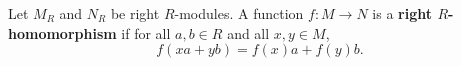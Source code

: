 Let $M_R$ and $N_R$ be right $R$-modules. A function $f: M \to N$ is a \textbf{right $R$-homomorphism} if for all $a, b \in R$ and all $x, y \in M$,
$$f(xa + yb) = f(x)a + f(y)b.$$
